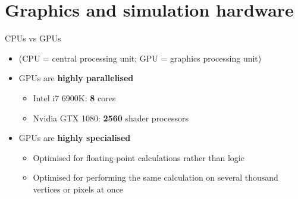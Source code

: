 \newcommand\blfootnote[1]{%
  \begingroup
  \renewcommand\thefootnote{}\footnote{#1}%
  \addtocounter{footnote}{-1}%
  \endgroup
}

\part{Graphics and simulation hardware}
\frame{\partpage}

\begin{frame}{CPUs vs GPUs}
	\begin{itemize}
		\pause \item (CPU = central processing unit; GPU = graphics processing unit)
		\pause \item GPUs are \textbf{highly parallelised}
			\begin{itemize}
				\pause \item Intel i7 6900K: \textbf{8} cores
				\pause \item Nvidia GTX 1080: \textbf{2560} shader processors
			\end{itemize}
		\pause \item GPUs are \textbf{highly specialised}
			\begin{itemize}
				\pause \item Optimised for floating-point calculations rather than logic
				\pause \item Optimised for performing the same calculation on several thousand vertices or pixels at once
			\end{itemize}
	\end{itemize}
\end{frame}

